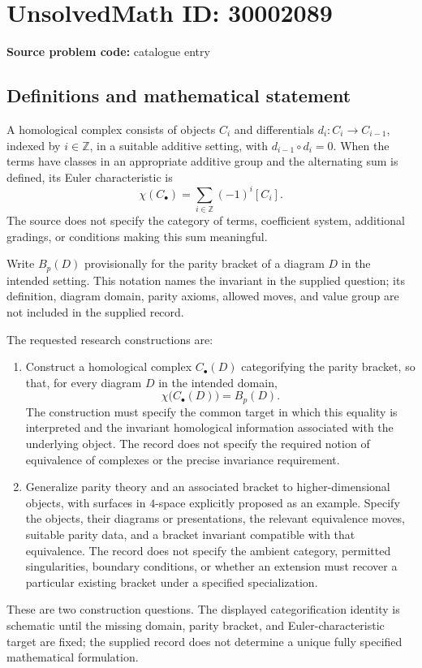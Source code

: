 \documentclass[11pt]{article}
\newcommand{\Z}{\mathbb{Z}}
\begin{document}
\section*{UnsolvedMath ID: 30002089}
\textbf{Source problem code:} catalogue entry
\subsection{Definitions and mathematical statement}
A homological complex consists of objects \(C_i\) and differentials \(d_i:C_i\to C_{i-1}\), indexed by \(i\in\Z\), in a suitable additive setting, with \(d_{i-1}\circ d_i=0\). When the terms have classes in an appropriate additive group and the alternating sum is defined, its Euler characteristic is
\[
\chi(C_\bullet)=\sum_{i\in\Z}(-1)^i[C_i].
\]
The source does not specify the category of terms, coefficient system, additional gradings, or conditions making this sum meaningful.

Write \(B_p(D)\) provisionally for the parity bracket of a diagram \(D\) in the intended setting. This notation names the invariant in the supplied question; its definition, diagram domain, parity axioms, allowed moves, and value group are not included in the supplied record.

The requested research constructions are:
\begin{enumerate}
\item Construct a homological complex \(C_\bullet(D)\) categorifying the parity bracket, so that, for every diagram \(D\) in the intended domain,
\[
\chi\bigl(C_\bullet(D)\bigr)=B_p(D).
\]
The construction must specify the common target in which this equality is interpreted and the invariant homological information associated with the underlying object. The record does not specify the required notion of equivalence of complexes or the precise invariance requirement.
\item Generalize parity theory and an associated bracket to higher-dimensional objects, with surfaces in \(4\)-space explicitly proposed as an example. Specify the objects, their diagrams or presentations, the relevant equivalence moves, suitable parity data, and a bracket invariant compatible with that equivalence. The record does not specify the ambient category, permitted singularities, boundary conditions, or whether an extension must recover a particular existing bracket under a specified specialization.
\end{enumerate}
These are two construction questions. The displayed categorification identity is schematic until the missing domain, parity bracket, and Euler-characteristic target are fixed; the supplied record does not determine a unique fully specified mathematical formulation.
\end{document}
